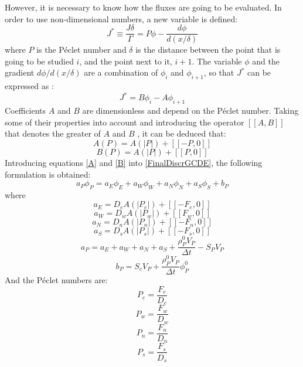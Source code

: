 However, it is necessary to know how the fluxes are going to be evaluated. In order to use non-dimensional numbers, a new variable is defined:
\begin{equation}
J^{*}\equiv\frac{J\delta}{\Gamma}=P\phi-\frac{d\phi}{d\left(x/\delta\right)}
\end{equation}
where $P$ is the Péclet number and $\delta$ is the distance between the point that is going to be studied $i$, and the point next to it, $i+1$. The variable $\phi$ and the gradient $d\phi/d\left(x/\delta\right)$ are a combination of $\phi_{i}$ and $\phi_{i+1}$, so that $J^{*}$ can be expressed as \cite{Patankar1980}:
\begin{equation}
J^{*}=B\phi_{i}-A\phi_{i+1}
\end{equation}
Coefficients $A$ and $B$ are dimensionless and depend on the Péclet number. Taking some of their properties into account and introducing the operator $[\![A,B]\!]$ that denotes the greater of $A$ and $B$ \cite{Patankar1980}, it can be deduced that:
\begin{equation}
A\left(P\right)=A\left(|P|\right)+[\![-P,0]\!]
\label{A}
\end{equation}
\begin{equation}
B\left(P\right)=A\left(|P|\right)+[\![P,0]\!]
\label{B}
\end{equation}
Introducing equations \ref{A} and \ref{B} into \ref{FinalDiscrGCDE}, the following formulation is obtained:
\begin{equation}
a_{P}\phi_{P}=a_{E}\phi_{E}+a_{W}\phi_{W}+a_{N}\phi_{N}+a_{S}\phi_{S}+b_{P}
\label{DiscretizedEquGCDE}
\end{equation}
\label{FinalDiscretizationGCDE}
where
\begin{equation}
a_{E}=D_{e}A\left(|P_{e}|\right)+[\![-F_{e},0]\!]
\end{equation}
\begin{equation}
a_{W}=D_{w}A\left(|P_{w}|\right)+[\![ F_{w},0]\!]
\end{equation}
\begin{equation}
a_{N}=D_{n}A\left(|P_{n}|\right)+[\![-F_{n},0]\!]
\end{equation}
\begin{equation}
a_{S}=D_{s}A\left(|P_{s}|\right)+[\![-F_{s},0]\!]
\end{equation}
\begin{equation}
a_{P}=a_{E}+a_{W}+a_{N}+a_{S}+\frac{\rho_{P}^{0}V_{P}}{\Delta t}-S_{P}V_{P}
\end{equation}
\begin{equation}
b_{P}=S_{c}V_{P}+\frac{\rho_{P}^{0}V_{P}}{\Delta t}\phi_{P}^{0}
\end{equation}
And the Péclet numbers are:
\begin{equation}
P_{e}=\frac{F_{e}}{D_{e}}
\end{equation}
\begin{equation}
P_{w}=\frac{F_{w}}{D_{w}}
\end{equation}
\begin{equation}
P_{n}=\frac{F_{n}}{D_{n}}
\end{equation}
\begin{equation}
P_{s}=\frac{F_{s}}{D_{s}}
\end{equation}

